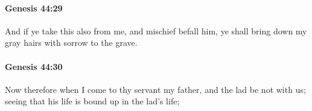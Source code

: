 		\paragraph{Genesis 44:29} %
			\label{GENESIS-44-29}

			And if ye take this also from me, and mischief befall him, ye shall bring down my gray hairs with sorrow to the grave.


		\paragraph{Genesis 44:30} %
			\label{GENESIS-44-30}

			Now therefore when I come to thy servant my father, and the lad be not with us; seeing that his life is bound up in the lad's life;


